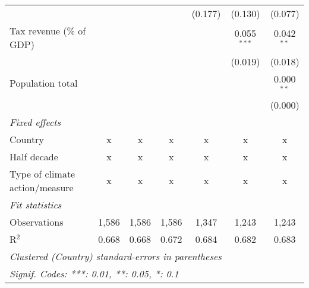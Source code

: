 \begin{tabular}{lcccccc}
                                                              &         &         &                & (0.177)        & (0.130)        & (0.077)\\   
   Tax revenue (\% of GDP)                                    &         &         &                &                & 0.055$^{***}$  & 0.042$^{**}$\\   
                                                              &         &         &                &                & (0.019)        & (0.018)\\   
   Population total                                           &         &         &                &                &                & 0.000$^{**}$\\   
                                                              &         &         &                &                &                & (0.000)\\   
   \emph{Fixed effects}\\
   Country                                                    & x       & x       & x              & x              & x              & x\\  
   Half decade                                                & x       & x       & x              & x              & x              & x\\  
   Type of climate action/measure                             & x       & x       & x              & x              & x              & x\\  
   \midrule \emph{Fit statistics}\\
   Observations                                               & 1,586   & 1,586   & 1,586          & 1,347          & 1,243          & 1,243\\  
   R$^2$                                                      & 0.668   & 0.668   & 0.672          & 0.684          & 0.682          & 0.683\\  
   \midrule
   \multicolumn{7}{l}{\emph{Clustered (Country) standard-errors in parentheses}}\\
   \multicolumn{7}{l}{\emph{Signif. Codes: ***: 0.01, **: 0.05, *: 0.1}}\\
\end{tabular}
\par\endgroup


